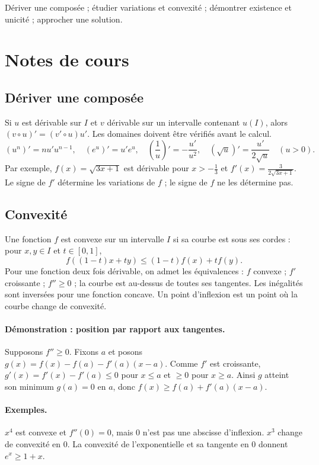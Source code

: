 \label{ch:4}


\begin{keypoint}[Objectifs]Dériver une composée ; étudier variations et convexité ; démontrer existence et unicité ; approcher une solution.\end{keypoint}

\section{Notes de cours}
\subsection{Dériver une composée}
Si $u$ est dérivable sur $I$ et $v$ dérivable sur un intervalle contenant $u(I)$, alors $(v\circ u)'=(v'\circ u)u'$. Les domaines doivent être vérifiés avant le calcul.
\[ (u^n)'=nu'u^{n-1},\quad(e^u)'=u'e^u,\quad
(\frac{1}{u})'=-\frac{u'}{u^2},\quad(\sqrt u)'=\frac{u'}{2\sqrt u}\quad(u>0).\]
Par exemple, $f(x)=\sqrt{3x+1}$ est dérivable pour $x>-\frac{1}{3}$ et $f'(x)=\frac{3}{2\sqrt{3x+1}}$. Le signe de $f'$ détermine les variations de $f$ ; le signe de $f$ ne les détermine pas.
\subsection{Convexité}
Une fonction $f$ est convexe sur un intervalle $I$ si sa courbe est sous ses cordes : pour $x,y\in I$ et $t\in[0,1]$,
\[f((1-t)x+ty)\le(1-t)f(x)+tf(y).\]
Pour une fonction deux fois dérivable, on admet les équivalences : $f$ convexe ; $f'$ croissante ; $f''\ge0$ ; la courbe est au-dessus de toutes ses tangentes. Les inégalités sont inversées pour une fonction concave. Un point d'inflexion est un point où la courbe change de convexité.
\paragraph{Démonstration : position par rapport aux tangentes.} Supposons $f''\ge0$. Fixons $a$ et posons $g(x)=f(x)-f(a)-f'(a)(x-a)$. Comme $f'$ est croissante, $g'(x)=f'(x)-f'(a)\le0$ pour $x\le a$ et $\ge0$ pour $x\ge a$. Ainsi $g$ atteint son minimum $g(a)=0$ en $a$, donc $f(x)\ge f(a)+f'(a)(x-a)$.
\paragraph{Exemples.} $x^4$ est convexe et $f''(0)=0$, mais $0$ n'est pas une abscisse d'inflexion. $x^3$ change de convexité en $0$. La convexité de l'exponentielle et sa tangente en $0$ donnent $e^x\ge1+x$.
